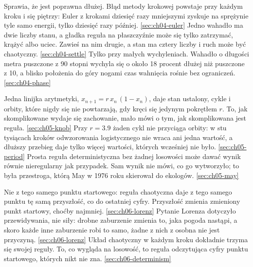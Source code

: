 %
  {Sprawia, że jest poprawna dłużej. Błąd metody krokowej powstaje przy każdym kroku i się piętrzy: Euler z krokami dziesięć razy mniejszymi zyskuje na sprężynie tyle samo energii, tylko dziesięć razy później.}%
  {\ref{sec:ch04-euler}}
%
  {Jedno wahadło ma dwie liczby stanu, a gładka reguła na płaszczyźnie może się tylko zatrzymać, krążyć albo uciec. Zawieś na nim drugie, a stan ma cztery liczby i ruch może być chaotyczny.}%
  {\ref{sec:ch04-settle}}
%
  {Tylko przy małych wychyleniach. Wahadło o długości metra puszczone z 90 stopni wychyla się o około 18 procent dłużej niż puszczone z 10, a blisko położenia do góry nogami czas wahnięcia rośnie bez ograniczeń.}%
  {\ref{sec:ch04-phase}}

%
  {Jedna linijka arytmetyki, $x_{n+1} = r\,x_n\,(1 - x_n)$, daje stan ustalony, cykle i orbity, które nigdy się nie powtarzają, gdy kręci się jedynym pokrętłem $r$. To, jak skomplikowane wydaje się zachowanie, mało mówi o tym, jak skomplikowana jest reguła.}%
  {\ref{sec:ch05-knob}}
%
  {Przy $r = \num{3.9}$ żaden cykl nie przyciąga orbity: w stu tysiącach kroków odwzorowania logistycznego nie wraca ani jedna wartość, a dłuższy przebieg daje tylko więcej wartości, których wcześniej nie było.}%
  {\ref{sec:ch05-period}}
%
  {Prosta reguła deterministyczna bez żadnej losowości może dawać wynik równie nieregularny jak przypadek. Sam wynik nie mówi, co go wytworzyło; to była przestroga, którą May w 1976 roku skierował do ekologów.}%
  {\ref{sec:ch05-may}}

%
  {Nie z tego samego punktu startowego: reguła chaotyczna daje z tego samego punktu tę samą przyszłość, co do ostatniej cyfry. Przyszłość zmienia zmieniony punkt startowy, choćby najmniej.}%
  {\ref{sec:ch06-lorenz}}
%
  {Pytanie Lorenza dotyczyło przewidywania, nie siły: drobne zaburzenie zmienia to, jaka pogoda nastąpi, a skoro każde inne zaburzenie robi to samo, żadne z nich z osobna nie jest przyczyną.}%
  {\ref{sec:ch06-lorenz}}
%
  {Układ chaotyczny w każdym kroku dokładnie trzyma się swojej reguły. To, co wygląda na losowość, to reguła odczytująca cyfry punktu startowego, których nikt nie zna.}%
  {\ref{sec:ch06-determinism}}

